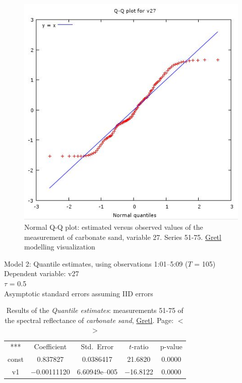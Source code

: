 \documentclass[11pt]{article}
\begin{document}
\begin{appendices}
\begin{figure}[H]
	\begin{center}
		\includegraphics[scale=0.4]{G-QQplot-sand.jpg}
		\caption{Normal Q-Q plot: estimated versus observed values of the measurement of carbonate sand, variable 27. Series 51-75. \href{http://gretl.sourceforge.net/}{Gretl} modelling visualization­}
	\label{fig:A.30}
	\end{center}
\end{figure}

\begin{table}[H]
	\caption{Results of the \textit{Quantile estimates}: measurements 51-75 of the spectral reflectance of \textit{carbonate sand}, \href{http://gretl.sourceforge.net/}{Gretl}. Page: $<$\pageref{page-41}$>$}
	\begin{center}
		Model 2: Quantile estimates, using observations 1:01--5:09 ($T$ = 105)\\
		Dependent variable: v27\\
		$\tau$ = 0.5\\
		Asymptotic standard errors assuming IID errors\\

\vspace{1em}

\begin{tabular}{c c c c c}
	***   & {Coefficient} & {Std.\ Error} & {$t$-ratio} & {p-value} \\[1ex]
	const &  0.837827 &    0.0386417 &      21.6820 &         0.0000 \\
	v1 &   $-$0.00111120 &     6.60949\textrm{e--005} &       $-$16.8122 &         0.0000 \\ \hline \hline
\end{tabular}


\end{center}
\end{table}
\end{appendices}
\end{document}
